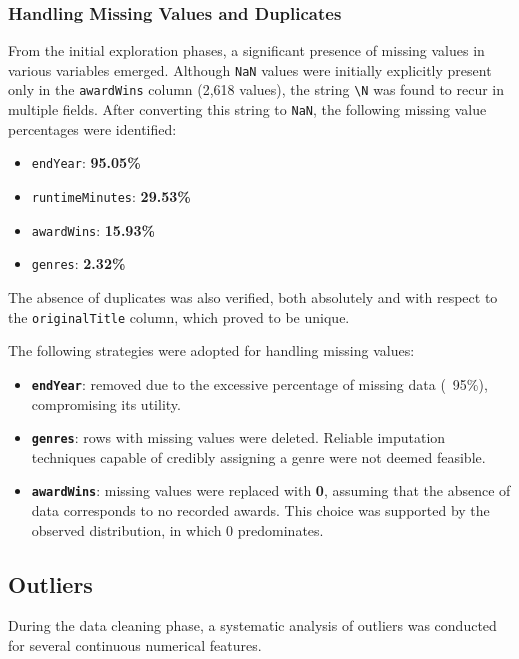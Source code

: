 \documentclass[10pt]{article}
\begin{document}
\subsubsection{Handling Missing Values and Duplicates}
From the initial exploration phases, a significant presence of missing values in various variables emerged. Although \texttt{NaN} values were initially explicitly present only in the \texttt{awardWins} column (2,618 values), the string \texttt{\textbackslash N} was found to recur in multiple fields. After converting this string to \texttt{NaN}, the following missing value percentages were identified:

\begin{itemize}
    \item \texttt{endYear}: \textbf{95.05\%}
    \item \texttt{runtimeMinutes}: \textbf{29.53\%}
    \item \texttt{awardWins}: \textbf{15.93\%}
    \item \texttt{genres}: \textbf{2.32\%}
\end{itemize}

The absence of duplicates was also verified, both absolutely and with respect to the \texttt{originalTitle} column, which proved to be unique.

The following strategies were adopted for handling missing values:

\begin{itemize}
    \item \textbf{\texttt{endYear}}: removed due to the excessive percentage of missing data (~95\%), compromising its utility.
    \item \textbf{\texttt{genres}}: rows with missing values were deleted. Reliable imputation techniques capable of credibly assigning a genre were not deemed feasible.
    \item \textbf{\texttt{awardWins}}: missing values were replaced with \textbf{0}, assuming that the absence of data corresponds to no recorded awards. This choice was supported by the observed distribution, in which 0 predominates.
\end{itemize}


\subsection{Outliers}
During the data cleaning phase, a systematic analysis of outliers was conducted for several continuous numerical features.
\end{document}
